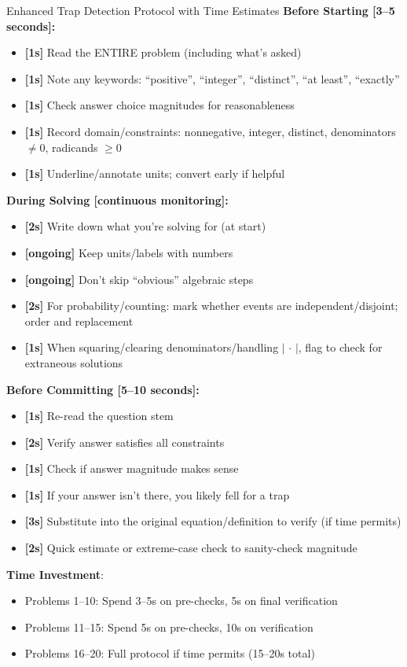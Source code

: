 \documentclass{article}
\begin{document}
\begin{trapbox}{Enhanced Trap Detection Protocol with Time Estimates}
\textbf{Before Starting [3--5 seconds]:}
\begin{itemize}[nosep]
\item[$\square$] \textbf{[1s]} Read the ENTIRE problem (including what's asked)
\item[$\square$] \textbf{[1s]} Note any keywords: ``positive'', ``integer'', ``distinct'', ``at least'', ``exactly''
\item[$\square$] \textbf{[1s]} Check answer choice magnitudes for reasonableness
\item[$\square$] \textbf{[1s]} Record domain/constraints: nonnegative, integer, distinct, denominators $\neq 0$, radicands $\ge 0$
\item[$\square$] \textbf{[1s]} Underline/annotate units; convert early if helpful
\end{itemize}

\textbf{During Solving [continuous monitoring]:}
\begin{itemize}[nosep]
\item[$\square$] \textbf{[2s]} Write down what you're solving for (at start)
\item[$\square$] \textbf{[ongoing]} Keep units/labels with numbers
\item[$\square$] \textbf{[ongoing]} Don't skip ``obvious'' algebraic steps
\item[$\square$] \textbf{[2s]} For probability/counting: mark whether events are independent/disjoint; order and replacement
\item[$\square$] \textbf{[1s]} When squaring/clearing denominators/handling $|\,\cdot\,|$, flag to check for extraneous solutions
\end{itemize}

\textbf{Before Committing [5--10 seconds]:}
\begin{itemize}[nosep]
\item[$\square$] \textbf{[1s]} Re-read the question stem
\item[$\square$] \textbf{[2s]} Verify answer satisfies all constraints
\item[$\square$] \textbf{[1s]} Check if answer magnitude makes sense
\item[$\square$] \textbf{[1s]} If your answer isn't there, you likely fell for a trap
\item[$\square$] \textbf{[3s]} Substitute into the original equation/definition to verify (if time permits)
\item[$\square$] \textbf{[2s]} Quick estimate or extreme-case check to sanity-check magnitude
\end{itemize}

\textbf{Time Investment}: 
\begin{itemize}[nosep]
\item Problems 1--10: Spend 3--5s on pre-checks, 5s on final verification
\item Problems 11--15: Spend 5s on pre-checks, 10s on verification
\item Problems 16--20: Full protocol if time permits (15--20s total)
\end{itemize}
\end{trapbox}
\end{document}
